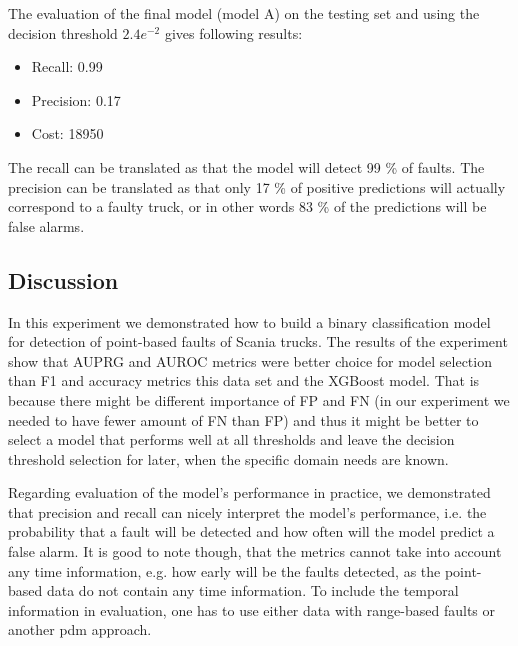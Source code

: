 The evaluation of the final model (model A) on the testing set and using the decision threshold $2.4e^{-2}$ gives following results: 
\begin{itemize}
    \item Recall: 0.99
    \item Precision: 0.17
    \item Cost: 18950
\end{itemize}
The recall can be translated as that the model will detect 99 \% of faults.
The precision can be translated as that only 17 \% of positive predictions will actually correspond to a faulty truck, or in other words 83 \% of the predictions will be false alarms.

\subsection{Discussion}

In this experiment we demonstrated how to build a binary classification model for detection of point-based faults of Scania trucks.
The results of the experiment show that AUPRG and AUROC metrics were better choice for model selection than F1 and accuracy metrics this data set and the XGBoost model.
That is because there might be different importance of FP and FN (in our experiment we needed to have fewer amount of FN than FP) and thus it might be better to select a model that performs well at all thresholds and leave the decision threshold selection for later, when the specific domain needs are known.

Regarding evaluation of the model's performance in practice, we demonstrated that precision and recall can nicely interpret the model's performance, i.e. the probability that a fault will be detected and how often will the model predict a false alarm.
It is good to note though, that the metrics cannot take into account any time information, e.g. how early will be the faults detected, as the point-based data do not contain any time information.
To include the temporal information in evaluation, one has to use either data with range-based faults or another \acrshort{pdm} approach.